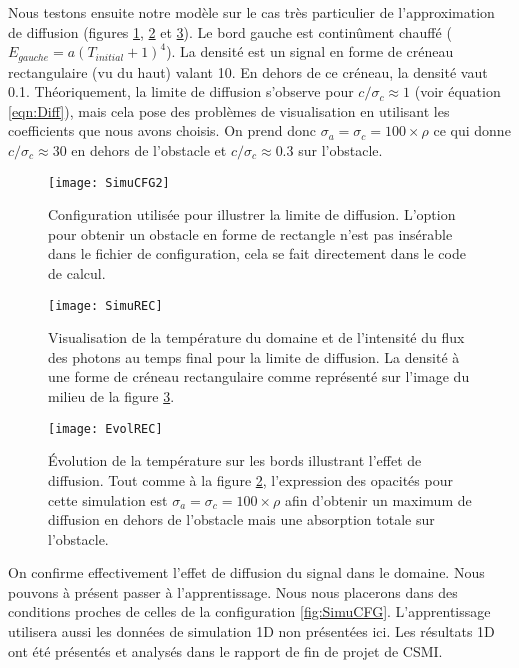 Nous testons ensuite notre modèle sur le cas très particulier de l'approximation de diffusion (figures \ref{fig:SimuCFG2}, \ref{fig:SimuREC} et \ref{fig:EvolREC}). Le bord gauche est continûment chauffé ($E_{gauche} = a(T_{initial}+1)^4$). La densité est un signal en forme de créneau rectangulaire (vu du haut) valant 10. En dehors de ce créneau, la densité vaut 0.1. Théoriquement, la limite de diffusion s'observe pour $c/\sigma_c \approx 1$ (voir équation \ref{eqn:Diff}), mais cela pose des problèmes de visualisation en utilisant les coefficients que nous avons choisis. On prend donc $\sigma_a = \sigma_c = 100 \times \rho$ ce qui donne $c / \sigma_c \approx 30$ en dehors de l'obstacle et $c / \sigma_c \approx 0.3$ sur l'obstacle.

\begin{figure}[!h]
\centering
\texttt{[image: SimuCFG2]} 
\decoRule
\caption[SimuCFG2]{Configuration utilisée pour illustrer la limite de diffusion. L'option pour obtenir un obstacle en forme de rectangle n'est pas insérable dans le fichier de configuration, cela se fait directement dans le code de calcul.}
\label{fig:SimuCFG2}
\end{figure}

\begin{figure}[!h]
\centering
\texttt{[image: SimuREC]} 
\decoRule
\caption[SimuREC]{Visualisation de la température du domaine et de l'intensité du flux des photons au temps final pour la limite de diffusion. La densité à une forme de créneau rectangulaire comme représenté sur l'image du milieu de la figure \ref{fig:EvolREC}.}
\label{fig:SimuREC}
\end{figure}

\begin{figure}[H]
\centering
\texttt{[image: EvolREC]} 
\decoRule
\caption[EvolREC]{Évolution de la température sur les bords illustrant l'effet de diffusion. Tout comme à la figure \ref{fig:SimuREC}, l'expression des opacités pour cette simulation est $\sigma_a = \sigma_c = 100 \times \rho$ afin d'obtenir un maximum de diffusion en dehors de l'obstacle mais une absorption totale sur l'obstacle.}
\label{fig:EvolREC}
\end{figure}

On confirme effectivement l'effet de diffusion du signal dans le domaine. Nous pouvons à présent passer à l'apprentissage. Nous nous placerons dans des conditions proches de celles de la configuration \ref{fig:SimuCFG}. L'apprentissage utilisera aussi les données de simulation 1D non présentées ici. Les résultats 1D ont été présentés et analysés dans le rapport de fin de projet de CSMI.

